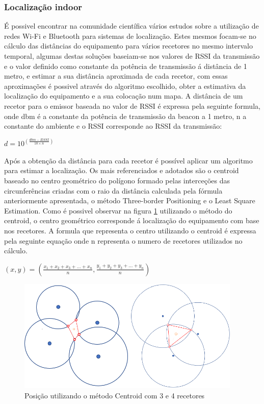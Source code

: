 \subsubsection{Localização indoor} \label{indoor}
\par
É possivel encontrar na comunidade científica vários estudos sobre a utilização de redes Wi-Fi e Bluetooth para sistemas de localização. Estes mesmos focam-se no cálculo das distâncias do equipamento para vários recetores no mesmo intervalo temporal, algumas destas soluções baseiam-se nos valores de RSSI da transmissão e o valor definido como constante da potência de transmissão á distância de 1 metro, e estimar a sua distância aproximada de cada recetor, com essas aproximações é possivel através do algoritmo escolhido\cite{Wang2013}, obter a estimativa da localização do equipamento e a sua colocação num mapa.
A distância de um recetor para o emissor baseada no  valor de RSSI é expressa pela seguinte formula, onde dbm é a constante da potência de transmissão da beacon a 1 metro, n a constante do ambiente e o RSSI corresponde ao RSSI da transmissão:
\par
\begin{center}
  $d=10^(\frac{dbm-RSSI}{10 \times n})$
\end{center}

\par
Após a obtenção da distância para cada recetor é possível  aplicar um algoritmo para estimar a localização. Os mais referenciados e adotados são o centroid baseado no centro geométrico do polígono formado pelas interceções das circunferências criadas com o raio da distância calculada pela fórmula anteriormente apresentada, o método Three-border Positioning e o Least Square Estimation.
Como é possivel observar na figura \ref{centroid} utilizando o método do centroid, o centro geométrico corresponde á localização do equipamento com base nos recetores. A formula que representa o centro utilizando o centroid é expressa pela seguinte equação onde n representa o numero de recetores utilizados no cálculo.
\par
\begin{center}
$ (x,y)= (\frac{x_{1}+x_{2}+x_{3}+...+x_{n}}{n},\frac{y_{1}+y_{2}+y_{3}+...+y_{n}}{n})$
\end{center}

\begin{figure}[htb]
\centering
\includegraphics[width=0.95\textwidth]{images/centroid3.png}
\caption{Posição utilizando o método Centroid com 3 e 4 recetores}\label{centroid}
\end{figure}

